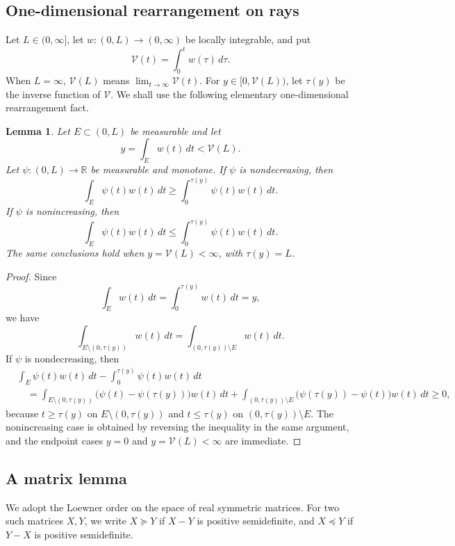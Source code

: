 \documentclass[11pt]{amsart}
\newtheorem{lemma}[theorem]{Lemma}
\theoremstyle{remark}
\newcommand{\RR}{\mathbb R}
\begin{document}
\subsection{One-dimensional rearrangement on rays}

Let $L\in(0,\infty]$, let $w:(0,L)\to(0,\infty)$ be locally integrable, and put
$$
        \mathcal V(t)=\int_0^t w(\tau)\,d\tau.
$$
When $L=\infty$, $\mathcal V(L)$ means $\lim_{t\to\infty}\mathcal V(t)$.  For $y\in[0,\mathcal V(L))$, let $\tau(y)$ be the inverse function of $\mathcal V$. We shall use the following elementary one-dimensional rearrangement fact.

\begin{lemma}\label{lem:ray-rearrangement}
Let $E\subset(0,L)$ be measurable and let
$$
        y=\int_Ew(t)\,dt<\mathcal V(L).
$$
Let $\psi:(0,L)\to\RR$ be measurable and monotone.    If $\psi$ is nondecreasing, then
$$
        \int_E\psi(t)w(t)\,dt
        \ge \int_0^{\tau(y)}\psi(t)w(t)\,dt.
$$
If $\psi$ is nonincreasing, then
$$
        \int_E\psi(t)w(t)\,dt
        \le \int_0^{\tau(y)}\psi(t)w(t)\,dt.
$$
The same conclusions hold when $y=\mathcal V(L)<\infty$, with $\tau(y)=L$.
\end{lemma}

\begin{proof}
Since
$$
        \int_E w(t)\,dt
        =
        \int_0^{\tau(y)} w(t)\,dt
        =y,
$$
we have
$$
        \int_{E\setminus(0,\tau(y))}w(t)\,dt
        =
        \int_{(0,\tau(y))\setminus E}w(t)\,dt .
$$
If \(\psi\) is nondecreasing, then
$$
\begin{aligned}
&\int_E\psi(t)w(t)\,dt
-\int_0^{\tau(y)}\psi(t)w(t)\,dt  \\
&\quad =
\int_{E\setminus(0,\tau(y))}
        \bigl(\psi(t)-\psi(\tau(y))\bigr)w(t)\,dt
+
\int_{(0,\tau(y))\setminus E}
        \bigl(\psi(\tau(y))-\psi(t)\bigr)w(t)\,dt
\ge0,
\end{aligned}
$$
because \(t\ge\tau(y)\) on \(E\setminus(0,\tau(y))\) and
\(t\le\tau(y)\) on \((0,\tau(y))\setminus E\).  The nonincreasing case is obtained by reversing the
inequality in the same argument, and the endpoint cases \(y=0\) and
\(y=\mathcal V(L)<\infty\) are immediate.
\end{proof}

\subsection{A matrix lemma}

We adopt the Loewner order on the space of real symmetric matrices. For two such matrices \(X,Y\), we write \(X \succeq Y\) if \(X-Y\) is positive semidefinite, and \(X \preceq Y\) if \(Y-X\) is positive semidefinite.
\end{document}
